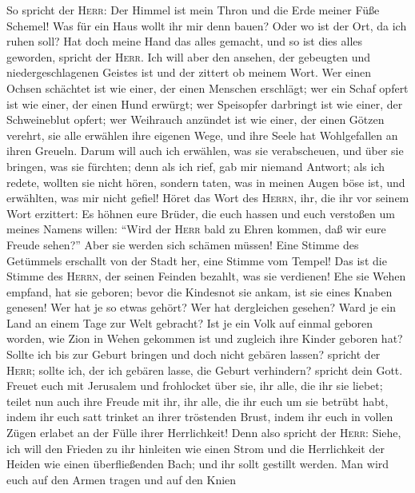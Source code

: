  So spricht der \textsc{Herr}: Der Himmel ist mein Thron
und die Erde meiner Füße Schemel! Was für ein Haus wollt ihr mir denn
bauen? Oder wo ist der Ort, da ich ruhen soll?  Hat doch
meine Hand das alles gemacht, und so ist dies alles geworden, spricht
der \textsc{Herr}. Ich will aber den ansehen, der gebeugten und
niedergeschlagenen Geistes ist und der zittert ob meinem Wort.
 Wer einen Ochsen schächtet ist wie einer, der einen
Menschen erschlägt; wer ein Schaf opfert ist wie einer, der einen Hund
erwürgt; wer Speisopfer darbringt ist wie einer, der Schweineblut
opfert; wer Weihrauch anzündet ist wie einer, der einen Götzen verehrt,
sie alle erwählen ihre eigenen Wege, und ihre Seele hat Wohlgefallen an
ihren Greueln.  Darum will auch ich erwählen, was sie
verabscheuen, und über sie bringen, was sie fürchten; denn als ich rief,
gab mir niemand Antwort; als ich redete, wollten sie nicht hören,
sondern taten, was in meinen Augen böse ist, und erwählten, was mir
nicht gefiel!  Höret das Wort des \textsc{Herrn}, ihr, die
ihr vor seinem Wort erzittert: Es höhnen eure Brüder, die euch hassen
und euch verstoßen um meines Namens willen: ``Wird der \textsc{Herr}
bald zu Ehren kommen, daß wir eure Freude sehen?'' Aber sie werden sich
schämen müssen!  Eine Stimme des Getümmels erschallt von
der Stadt her, eine Stimme vom Tempel! Das ist die Stimme des
\textsc{Herrn}, der seinen Feinden bezahlt, was sie verdienen!
 Ehe sie Wehen empfand, hat sie geboren; bevor die
Kindesnot sie ankam, ist sie eines Knaben genesen!  Wer
hat je so etwas gehört? Wer hat dergleichen gesehen? Ward je ein Land an
einem Tage zur Welt gebracht? Ist je ein Volk auf einmal geboren worden,
wie Zion in Wehen gekommen ist und zugleich ihre Kinder geboren hat?
 Sollte ich bis zur Geburt bringen und doch nicht gebären
lassen? spricht der \textsc{Herr}; sollte ich, der ich gebären lasse,
die Geburt verhindern? spricht dein Gott.  Freuet euch
mit Jerusalem und frohlocket über sie, ihr alle, die ihr sie liebet;
teilet nun auch ihre Freude mit ihr, ihr alle, die ihr euch um sie
betrübt habt,  indem ihr euch satt trinket an ihrer
tröstenden Brust, indem ihr euch in vollen Zügen erlabet an der Fülle
ihrer Herrlichkeit!  Denn also spricht der \textsc{Herr}:
Siehe, ich will den Frieden zu ihr hinleiten wie einen Strom und die
Herrlichkeit der Heiden wie einen überfließenden Bach; und ihr sollt
gestillt werden. Man wird euch auf den Armen tragen und auf den Knien
